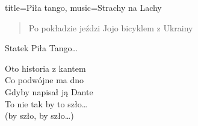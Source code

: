 \begin{song}{title={Piła tango}, music={Strachy na Lachy}}
\begin{verse}
        Po pokładzie jeździ Jojo bicyklem z Ukrainy
    \end{verse}
    \begin{chorus}
        Statek Piła Tango\ldots
    \end{chorus}
    \begin{interlude}
        Oto historia z kantem \\
        Co podwójne ma dno \\
        Gdyby napisał ją Dante \\
        To nie tak by to szło\ldots \\
        (by szło, by szło\ldots)
    \end{interlude}
\end{song}

